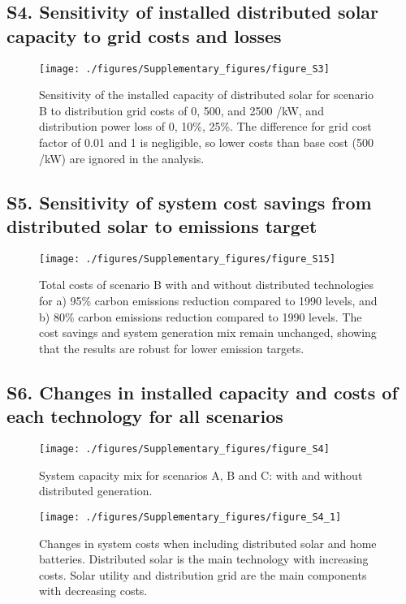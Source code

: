 \subsection*{S4. Sensitivity of installed distributed solar capacity to grid costs and losses}

\begin{figure}[H]
\renewcommand*{\thefigure}{S\arabic{figure}}
\texttt{[image: ./figures/Supplementary\_figures/figure\_S3]}
\caption{Sensitivity of the installed capacity of distributed solar for scenario B to distribution grid costs of 0, 500, and 2500 \texteuro /kW, and distribution power loss of 0, 10\%, 25\%. The difference for grid cost factor of 0.01 and 1 is negligible, so lower costs than base cost (500 \texteuro /kW) are ignored in the analysis.}

\end{figure}

\subsection*{S5. Sensitivity of system cost savings from distributed solar to emissions target}

\begin{figure}[H]
\renewcommand*{\thefigure}{S\arabic{figure}}
\texttt{[image: ./figures/Supplementary\_figures/figure\_S15]}
\caption{Total costs of scenario B with and without distributed technologies for a) 95\% carbon emissions reduction compared to 1990 levels, and b) 80\% carbon emissions reduction compared to 1990 levels. The cost savings and system generation mix remain unchanged, showing that the results are robust for lower emission targets. }
\end{figure}

\subsection*{S6. Changes in installed capacity and costs of each technology for all scenarios}

\begin{figure}[H]
\renewcommand*{\thefigure}{S\arabic{figure}}
\texttt{[image: ./figures/Supplementary\_figures/figure\_S4]}
\caption{System capacity mix for scenarios A, B and C: with and without distributed generation.}
\end{figure}

\begin{figure}[H]
\renewcommand*{\thefigure}{S\arabic{figure}}
\texttt{[image: ./figures/Supplementary\_figures/figure\_S4\_1]}
\caption{Changes in system costs when including distributed solar and home batteries. Distributed solar is the main technology with increasing costs. Solar utility and distribution grid are the main components with decreasing costs.}
\end{figure}



